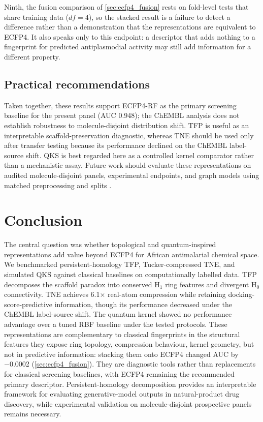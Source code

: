 \documentclass[11pt,a4paper]{article}
\begin{document}
Ninth, the fusion comparison of \cref{sec:ecfp4_fusion} rests on fold-level tests that share training data ($df = 4$), so the stacked result is a failure to detect a difference rather than a demonstration that the representations are equivalent to ECFP4. It also speaks only to this endpoint: a descriptor that adds nothing to a fingerprint for predicted antiplasmodial activity may still add information for a different property.

\subsection{Practical recommendations}

Taken together, these results support ECFP4-RF as the primary screening baseline for the present panel (AUC \num{0.948}); the ChEMBL analysis does not establish robustness to molecule-disjoint distribution shift. TFP is useful as an interpretable scaffold-preservation diagnostic, whereas TNE should be used only after transfer testing because its performance declined on the ChEMBL label-source shift. QKS is best regarded here as a controlled kernel comparator rather than a mechanistic assay. Future work should evaluate these representations on audited molecule-disjoint panels, experimental endpoints, and graph models using matched preprocessing and splits \citep{topologynet_2018}.


\section{Conclusion}

The central question was whether topological and quantum-inspired representations add value beyond ECFP4 for African antimalarial chemical space. We benchmarked persistent-homology TFP, Tucker-compressed TNE, and simulated QKS against classical baselines on computationally labelled data. TFP decomposes the scaffold paradox into conserved H$_1$ ring features and divergent H$_0$ connectivity. TNE achieves \num{6.1}$\times$ real-atom compression while retaining docking-score-predictive information, though its performance decreased under the ChEMBL label-source shift. The quantum kernel showed no performance advantage over a tuned RBF baseline under the tested protocols. These representations are complementary to classical fingerprints in the structural features they expose ring topology, compression behaviour, kernel geometry, but not in predictive information: stacking them onto ECFP4 changed AUC by \num{-0.0002} (\cref{sec:ecfp4_fusion}). They are diagnostic tools rather than replacements for classical screening baselines, with ECFP4 remaining the recommended primary descriptor. Persistent-homology decomposition provides an interpretable framework for evaluating generative-model outputs in natural-product drug discovery, while experimental validation on molecule-disjoint prospective panels remains necessary.
\end{document}
